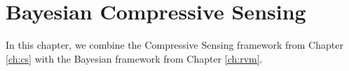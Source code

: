 \chapter{Bayesian Compressive Sensing}
\label{ch:bcs}
In this chapter, we combine the Compressive Sensing framework from Chapter \ref{ch:cs} with the Bayesian framework from Chapter \ref{ch:rvm}.







